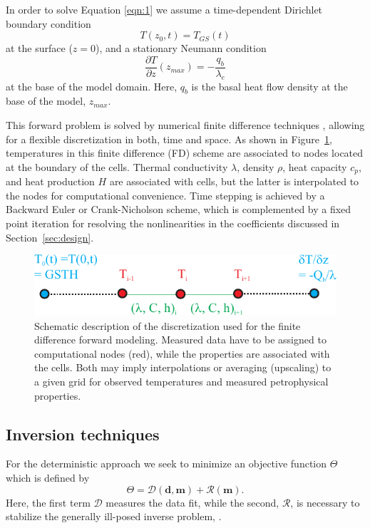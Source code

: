 \documentclass[cp]{copernicus}
\begin{document}
In order to solve Equation \ref{eqn:1} we assume a time-dependent Dirichlet boundary condition 
\begin{equation}\label{eqn:3a} 
T(z_0,t)=T_{GS}(t)
\end{equation} 
\noindent at the surface ($z=0$), and a stationary Neumann condition
\begin{equation}\label{eqn:3b}
\frac{\partial T}{\partial z}(z_{max }) = - \frac{q_b}{\lambda_e}
\end{equation} 
\noindent at the base of the model domain. Here, $q_b$ is the basal heat flow density at the base 
 of the model, $z_{max}$. 
 
This forward problem is solved by numerical finite difference techniques \cite[e.g.,][] 
{Patankar1980a}, allowing for a flexible discretization in both, time and space. As shown in 
Figure~\ref{fig:FD}, temperatures in this finite difference (FD) scheme are associated to nodes 
located at the boundary of the cells. Thermal conductivity $\lambda$, density $\rho$, heat capacity 
$c_p$, and heat production $H$ are associated with cells, but the latter is interpolated to the 
nodes for computational convenience. Time stepping is achieved by a Backward Euler or 
Crank-Nicholson scheme, which is complemented by a fixed point iteration for resolving the 
nonlinearities in the coefficients discussed in Section~\ref{sec:design}.


\begin{figure}%
 \centering
 \includegraphics[width=\columnwidth]{Figures/FDScheme}
 \caption[Schematic description of the finite difference discretization.]{Schematic description of 
the discretization used for the finite difference forward modeling. Measured data have to be 
assigned to computational nodes (red), while the properties are associated with the cells. Both may 
imply interpolations or averaging (upscaling) to a given grid for observed temperatures and 
measured petrophysical properties.}
\label{fig:FD}
\end{figure}

\subsection{Inversion techniques}
\label{sec:tinv}
For the deterministic approach we seek to minimize an objective function $\Theta$ which is defined 
by
\begin{equation}\label{eqn:4}
\Theta = \mathcal{D}\left(\mathbf{d},\mathbf{m}\right) + \mathcal{R}\left(\mathbf{m} \right).
\end{equation} 
\noindent Here, the first term $\mathcal{D}$ measures the data fit, while the second, 
$\mathcal{R}$, is necessary to stabilize the generally ill-posed inverse problem, \cite[see] [] 
{Aster2019a}. 
\end{document}
